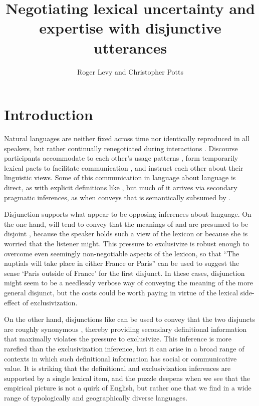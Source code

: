 \documentclass{article}
\begin{document}

\title{Negotiating lexical uncertainty and expertise with disjunctive utterances}
\author{Roger Levy and Christopher Potts}
\maketitle


\section{Introduction}\label{sec:introduction}

Natural languages are neither fixed across time nor identically
reproduced in all speakers, but rather continually renegotiated during
interactions \citep{Clark97}. Discourse participants accommodate to
each other's usage patterns \citep{Giles:2008,DanLeePan:2012}, form
temporarily lexical pacts to facilitate communication
\citep{Clark:Wilkes-Gibbs:1986}, and instruct each other about their
linguistic views. Some of this communication in language about
language is direct, as with explicit definitions like
, but much of it arrives via
secondary pragmatic inferences, as when  conveys
that  is semantically subsumed by  \citep{Hearst92,SnowEtAl05}.

Disjunction supports what appear to be opposing inferences about
language. On the one hand,  will tend to convey that the
meanings of  and  are presumed to be disjoint
\citep{Hurford:1974}, because the speaker holds such a view of the
lexicon or because she is worried that the listener might. This
pressure to exclusivize is robust enough to overcome even seemingly
non-negotiable aspects of the lexicon, so that ``The nuptials will
take place in either France or Paris'' can be used to suggest the
sense `Paris outside of France' for the first disjunct. In these
cases, disjunction might seem to be a needlessly verbose way of
conveying the meaning of the more general disjunct, but the costs
could be worth paying in virtue of the lexical side-effect of
exclusivization.

On the other hand, disjunctions like 
can be used to convey that the two disjuncts are roughly synonymous
\citep{Horn89,Rohdenburg:1985}, thereby providing secondary
definitional information that maximally violates the pressure to
exclusivize. This inference is more rarefied than the exclusivization
inference, but it can arise in a broad range of contexts in which such
definitional information has social or communicative value. It is
striking that the definitional and exclusivization inferences are
supported by a single lexical item, and the puzzle deepens when we see
that the empirical picture is not a quirk of English, but rather one
that we find in a wide range of typologically and geographically
diverse languages.
\end{document}
